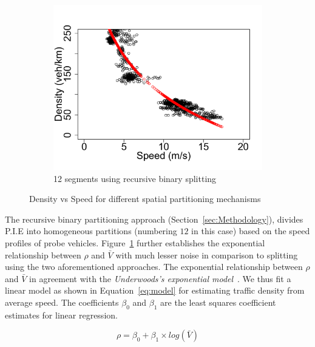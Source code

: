 \documentclass[procedia]{easychair}
\begin{document}
\begin{figure}[!htbp]
\begin{subfigure}{.5\linewidth}
\end{subfigure}\\[1ex]
\begin{subfigure}{\linewidth}
\centering
\includegraphics[clip=true,trim=0.1cm 0cm 0.0cm 1.5cm,scale=0.35]{graphs/Simulated/density-vs-speed-dt}
\caption{12 segments using recursive binary splitting}
\label{fig:splitting-dt}
\end{subfigure}
\caption{Density vs Speed for different spatial partitioning mechanisms}
\label{fig:partition-highway}
\end{figure}
 
 
 
  The recursive binary partitioning approach (Section~\ref{sec:Methodology}), divides P.I.E into  homogeneous partitions (numbering $12$ in this case) based on the speed profiles of probe vehicles. Figure~\ref{fig:splitting-dt} further establishes the exponential relationship between $\rho$ and $\bar{V}$ with much lesser noise in comparison to splitting using the two aforementioned approaches. The exponential relationship between $\rho$ and $\bar{V}$ in agreement with the {\it Underwoods's exponential model}~\cite{greenshields1961quality}. We thus fit a linear model as shown in Equation~\ref{eq:model} for estimating traffic density from average speed. The coefficients $\beta_{0}$ and $\beta_{1}$ are the least squares coefficient estimates for linear regression.

\begin{equation} 
\label{eq:model}
\rho= \beta_{0}+\beta_{1}\times log(\bar{V})
\end{equation}
 
\end{document}

